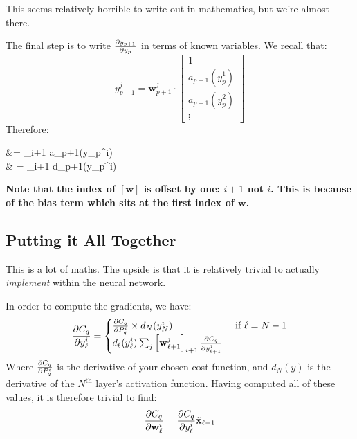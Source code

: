 \documentclass[a4paper,openany,11pt]{book}
\renewcommand\vec[1]{\boldsymbol{\mathbf{#1}}}
\begin{document}
			This seems relatively horrible to write out in mathematics, but we're almost there. 

			The final step is to write $\frac{\partial y_{p+1}}{\partial y_p}$ in terms of known variables. We recall that:
			\begin{equation}
				y^j_{p+1} = \vec{w}_{p+1}^j \cdot \begin{bmatrix} 1 \\ a_{p+1}(y_p^1) \\ a_{p+1}(y_p^2) \\ \vdots \end{bmatrix}
			\end{equation}
			Therefore:
			\begin{spalign}
				 &= \left[ \vec{w}_{p+1}^j \right]_{i+1}  a_{p+1}(y_p^i)
				\\
				& = \left[ \vec{w}_{p+1}^j \right]_{i+1} d_{p+1}(y_p^i)
			\end{spalign}
			\textbf{Note that the index of $[\vec{w}]$ is offset by one: $i+1$ not $i$. This is because of the bias term which sits at the first index of $\vec{w}$.}

			
			\subsection{Putting it All Together}

				This is a lot of maths. The upside is that it is relatively trivial to actually \textit{implement} within the neural network. 

				In order to compute the gradients, we have:
				\begin{equation}
					\pdiv{C_q}{y_\ell^i} = \begin{cases} \pdiv{C_q}{P_q^i} \times d_N(y_N^i) & \text{ if $\ell = N-1$}
					\\
					d_\ell(y_\ell^i) \sum_{j}  \left[ \vec{w}_{\ell+1}^j \right]_{i+1} \pdiv{C_q}{y_{\ell+1}^j}
					
					\end{cases}
				\end{equation}
				Where $\frac{\partial C_q}{\partial P_q^i}$ is the derivative of your chosen cost function, and $d_N(y)$ is the derivative of the $N^\text{th}$ layer's activation function. Having computed all of these values, it is therefore trivial to find:
				\begin{equation}
					\pdiv{C_q}{\vec{w}_\ell^i} = \pdiv{C_q}{y_\ell^i} \tilde{\vec{x}}_{\ell-1}
				\end{equation}
\end{document}
